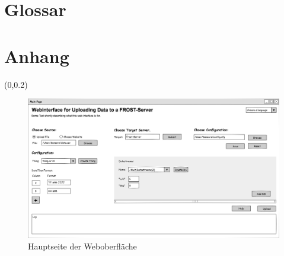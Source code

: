 \documentclass[a4paper, 12 pt]{article}
\begin{document}
	
	
	\newpage
	\section{Glossar}
	\printnoidxglossaries
	
\newpage
\section{Anhang}
\pagestyle{empty}
\begin{textblock*}{\paperwidth}(0\paperwidth ,0.2\paperheight)
\begin{figure}[t]
\centering
\noindent\includegraphics[scale=0.5, angle=90]{images/gui}
\caption{\label{fig:guiMainA}Hauptseite der Weboberfläche}
\end{figure}
\end{textblock*}
	
\end{document}
